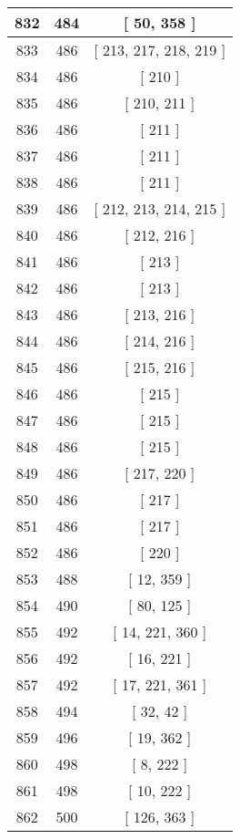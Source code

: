 \begin{center}
\begin{longtable}[H]{|| c c c ||}
832 & 484 & [ 50, 358 ]
\\\hline
833 & 486 & [ 213, 217, 218, 219 ]
\\\hline
834 & 486 & [ 210 ]
\\\hline
835 & 486 & [ 210, 211 ]
\\\hline
836 & 486 & [ 211 ]
\\\hline
837 & 486 & [ 211 ]
\\\hline
838 & 486 & [ 211 ]
\\\hline
839 & 486 & [ 212, 213, 214, 215 ]
\\\hline
840 & 486 & [ 212, 216 ]
\\\hline
841 & 486 & [ 213 ]
\\\hline
842 & 486 & [ 213 ]
\\\hline
843 & 486 & [ 213, 216 ]
\\\hline
844 & 486 & [ 214, 216 ]
\\\hline
845 & 486 & [ 215, 216 ]
\\\hline
846 & 486 & [ 215 ]
\\\hline
847 & 486 & [ 215 ]
\\\hline
848 & 486 & [ 215 ]
\\\hline
849 & 486 & [ 217, 220 ]
\\\hline
850 & 486 & [ 217 ]
\\\hline
851 & 486 & [ 217 ]
\\\hline
852 & 486 & [ 220 ]
\\\hline
853 & 488 & [ 12, 359 ]
\\\hline
854 & 490 & [ 80, 125 ]
\\\hline
855 & 492 & [ 14, 221, 360 ]
\\\hline
856 & 492 & [ 16, 221 ]
\\\hline
857 & 492 & [ 17, 221, 361 ]
\\\hline
858 & 494 & [ 32, 42 ]
\\\hline
859 & 496 & [ 19, 362 ]
\\\hline
860 & 498 & [ 8, 222 ]
\\\hline
861 & 498 & [ 10, 222 ]
\\\hline
862 & 500 & [ 126, 363 ]
\\\hline
\end{longtable}
\end{center}
